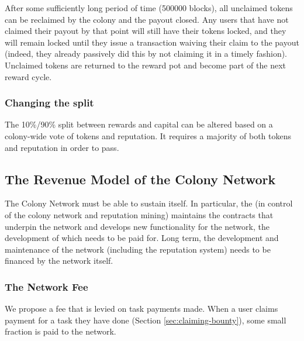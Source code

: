After some sufficiently long period of time (500000 blocks), all unclaimed tokens can be reclaimed by the colony and the payout closed. Any users that have not claimed their payout by that point will still have their tokens locked, and they will remain locked until they issue a transaction waiving their claim to the payout (indeed, they already passively did this by not claiming it in a timely fashion). Unclaimed tokens are returned to the reward pot and become part of the next reward cycle.


\subsubsection{Changing the split}\label{subsec:chaning-the-reward-split}

The 10\%/90\% split between rewards and capital can be altered based on a colony-wide vote of tokens and reputation. It requires a majority of both tokens and reputation in order to pass.




\subsection{The Revenue Model of the Colony Network}\label{sec:networkrevenue}
The Colony Network must be able to sustain itself. In particular, the \rc (in control of the colony network and reputation mining) maintains the contracts that underpin the network and develops new functionality for the network, the development of which needs to be paid for. Long term, the development and maintenance of the network (including the reputation system) needs to be financed by the network itself. 

\subsubsection{The Network Fee}\label{sec:networkfee}
We propose a fee that is levied on task payments made. When a user claims payment for a task they have done (Section \ref{sec:claiming-bounty}), some small fraction is paid to the network. 


